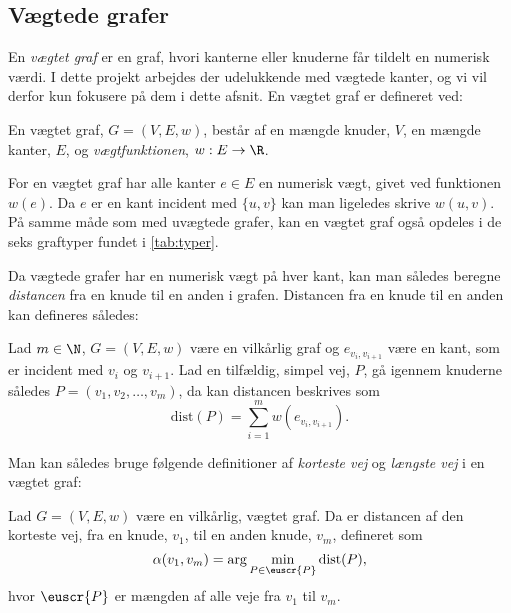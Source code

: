 \subsection{Vægtede grafer} \label{kap:vaegtede}
En \emph{vægtet graf} er en graf, hvori kanterne eller knuderne får tildelt en numerisk værdi. I dette projekt arbejdes der udelukkende med vægtede kanter, og vi vil derfor kun fokusere på dem i dette afsnit.
En vægtet graf er defineret ved:
\begin{defn}
En vægtet graf, $G=(V,E,w)$, består af en mængde knuder, $V$, en mængde kanter, $E$, og \emph{vægtfunktionen}, $w: E \rightarrow \R$.
\end{defn}

For en vægtet graf har alle kanter $e\in E$ en numerisk vægt, givet ved funktionen $w (e)$. Da $e$ er en kant incident med $\{u,v\}$ kan man ligeledes skrive $w (u,v)$. På samme måde som med uvægtede grafer, kan en vægtet graf også opdeles i de seks graftyper fundet i \autoref{tab:typer}.


Da vægtede grafer har en numerisk vægt på hver kant, kan man således beregne \emph{distancen} fra en knude til en anden i grafen. Distancen fra en knude til en anden kan defineres således:

\begin{defn}[Distance]
Lad $m\in \N $, $G=(V,E,w)$ være en vilkårlig graf og  $e_{v_i,v_{i+1}}$ være en kant, som er incident med $v_i$ og $v_{i+1}$. Lad en tilfældig, simpel vej, $P$, gå igennem knuderne således $P=(v_{1},v_{2},\dotsc,v_{m})$, da kan distancen beskrives som
	\begin{equation}
	\mathrm{dist}(P)=\sum_{i=1}^{m}w(e_{v_i,v_{i+1}}).
	\end{equation}  
\end{defn}

Man kan således bruge følgende definitioner af \emph{korteste vej} og \emph{længste vej} i en vægtet graf:


\begin{defn} \label{defn:min.vej}
Lad $G=(V,E,w)$ være en vilkårlig, vægtet graf. Da er distancen af den korteste vej, fra en knude, $v_1$, til en anden knude, $v_m$, defineret som
	\begin{equation}
		\alpha(v_1,v_m)=\arg \min_{P \in \euscr{P}}
		\textrm{dist}(P),
	\end{equation}
	hvor $\euscr{P}$ er mængden af alle veje fra $v_1$ til $v_m$.
\end{defn}

